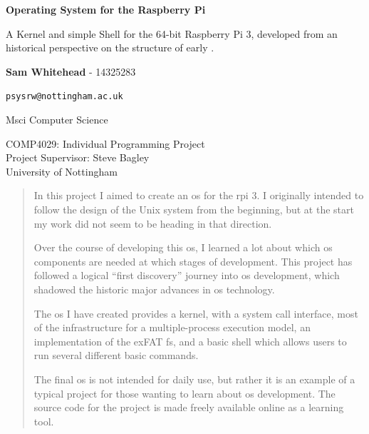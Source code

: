\documentclass{article}
\begin{document}
\begin{titlepage}
    \begin{center}
        \null\mbox{}\vfill

        \vspace*{1cm}

        \huge
        \textbf{Operating System for the Raspberry Pi}

        \vspace{0.5cm}
        \Large
        A Kernel and simple Shell for the 64-bit Raspberry Pi 3, developed
        from an historical perspective on the structure of early
        .

        \Large

        \vspace{2.5cm}

        \textbf{Sam Whitehead} - 14325283

        \texttt{psysrw@nottingham.ac.uk}

        Msci Computer Science

        \vfill

        COMP4029: Individual Programming Project\\
        Project Supervisor: Steve Bagley\\
        University of Nottingham

        \vfill

        \begin{abstract}
            In this project I aimed to create an \gls{os} for the \gls{rpi} 3.
            I originally intended to follow the design of the Unix system from
            the beginning, but at the start my work did not seem to be heading
            in that direction.

            Over the course of developing this \gls{os}, I learned a lot about
            which \gls{os} components are needed at which stages of
            development. This project has followed a logical ``first
            discovery'' journey into \gls{os} development, which shadowed the
            historic major advances in \gls{os} technology.

            The \gls{os} I have created provides a kernel, with a system call
            interface, most of the infrastructure for a multiple-process
            execution model, an implementation of the exFAT \gls{fs}, and a
            basic shell which allows users to run several different basic
            commands.

            The final \gls{os} is not intended for daily use, but rather it is
            an example of a typical project for those wanting to learn about
            \gls{os} development. The source code for the project is made
            freely available online as a learning tool.
        \end{abstract}

        \vfill\null
    \end{center}
    \thispagestyle{empty}
\end{titlepage}
\addtocounter{page}{1}
\end{document}
